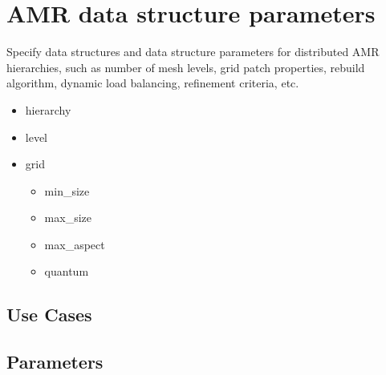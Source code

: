 \section{AMR data structure parameters} \label{s:amr}

Specify data structures and data structure parameters for distributed
AMR hierarchies, such as number of mesh levels, grid patch properties,
rebuild algorithm, dynamic load balancing, refinement criteria, etc.

\begin{itemize}
\item hierarchy
\item level
\item grid
\begin{itemize}
\item min\_size
\item max\_size
\item max\_aspect
\item quantum
\end{itemize}
\end{itemize}

\subsection{Use Cases}
\subsection{Parameters}

